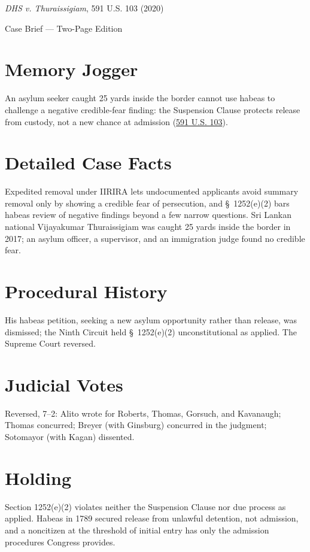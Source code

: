 \documentclass[12pt]{article}
\begin{document}
\begin{center}
{\LARGE \textit{DHS v. Thuraissigiam}, 591 U.S. 103 (2020)\par}
\vspace{0.5em}
{\large Case Brief --- Two-Page Edition\par}
\end{center}

\section{Memory Jogger}
An asylum seeker caught 25 yards inside the border cannot use habeas to challenge a negative credible-fear finding: the Suspension Clause protects release from custody, not a new chance at admission (\href{https://supreme.justia.com/cases/federal/us/591/19-161/}{591 U.S. 103}).

\section{Detailed Case Facts}
Expedited removal under IIRIRA lets undocumented applicants avoid summary removal only by showing a credible fear of persecution, and \S\ 1252(e)(2) bars habeas review of negative findings beyond a few narrow questions. Sri Lankan national Vijayakumar Thuraissigiam was caught 25 yards inside the border in 2017; an asylum officer, a supervisor, and an immigration judge found no credible fear.

\section{Procedural History}
His habeas petition, seeking a new asylum opportunity rather than release, was dismissed; the Ninth Circuit held \S\ 1252(e)(2) unconstitutional as applied. The Supreme Court reversed.

\section{Judicial Votes}
Reversed, 7--2: Alito wrote for Roberts, Thomas, Gorsuch, and Kavanaugh; Thomas concurred; Breyer (with Ginsburg) concurred in the judgment; Sotomayor (with Kagan) dissented.

\section{Holding}
Section 1252(e)(2) violates neither the Suspension Clause nor due process as applied. Habeas in 1789 secured release from unlawful detention, not admission, and a noncitizen at the threshold of initial entry has only the admission procedures Congress provides.
\end{document}
